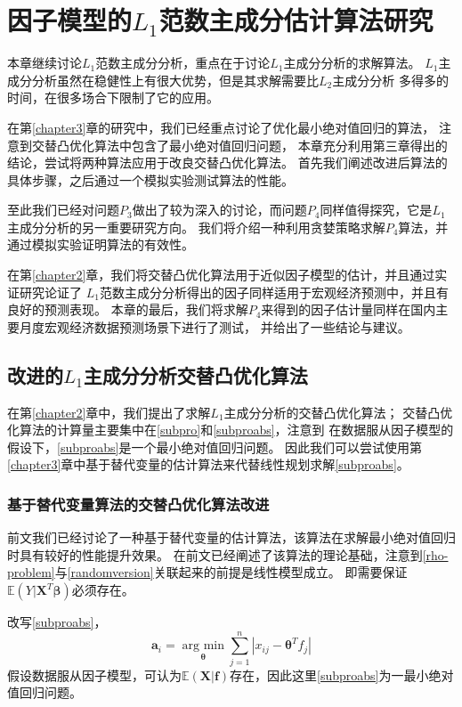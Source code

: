 \section{因子模型的$L_1$范数主成分估计算法研究}

本章继续讨论$L_1$范数主成分分析，重点在于讨论$L_1$主成分分析的求解算法。
$L_1$主成分分析虽然在稳健性上有很大优势，但是其求解需要比$L_2$主成分分析
多得多的时间，在很多场合下限制了它的应用。

在第\ref{chapter3}章的研究中，我们已经重点讨论了优化最小绝对值回归的算法，
注意到交替凸优化算法中包含了最小绝对值回归问题，
本章充分利用第三章得出的结论，尝试将两种算法应用于改良交替凸优化算法。
首先我们阐述改进后算法的具体步骤，之后通过一个模拟实验测试算法的性能。

至此我们已经对问题$P_3$做出了较为深入的讨论，而问题$P_4$同样值得探究，它是$L_1$主成分分析的另一重要研究方向。
我们将介绍一种利用贪婪策略求解$P_4$算法，并通过模拟实验证明算法的有效性。

在第\ref{chapter2}章，我们将交替凸优化算法用于近似因子模型的估计，并且通过实证研究论证了
$L_1$范数主成分分析得出的因子同样适用于宏观经济预测中，并且有良好的预测表现。
本章的最后，我们将求解$P_4$来得到的因子估计量同样在国内主要月度宏观经济数据预测场景下进行了测试，
并给出了一些结论与建议。

\subsection{改进的$L_1$主成分分析交替凸优化算法}
在第\ref{chapter2}章中，我们提出了求解$L_1$主成分分析的交替凸优化算法；
交替凸优化算法的计算量主要集中在\eqref{subpro}和\eqref{subproabs}，注意到
在数据服从因子模型的假设下，\eqref{subproabs}是一个最小绝对值回归问题。
因此我们可以尝试使用第\ref{chapter3}章中基于替代变量的估计算法来代替线性规划求解\eqref{subproabs}。

\subsubsection{基于替代变量算法的交替凸优化算法改进}
前文我们已经讨论了一种基于替代变量的估计算法，该算法在求解最小绝对值回归时具有较好的性能提升效果。
在前文已经阐述了该算法的理论基础，注意到\eqref{rho-problem}与\eqref{randomversion}关联起来的前提是线性模型成立。
即需要保证$\mathbb E(Y|\bm{X}^T\bm{\beta})$必须存在。

改写\eqref{subproabs}，
\begin{equation}
    \bm a_i = \underset{\bm {\theta}}{\operatorname{arg\ min}} \sum_{j=1}^n |x_{ij} -\bm{\theta}^Tf_j|
\end{equation}
假设数据服从因子模型，可认为$\mathbb E (\bm X|\bm{f})$存在，因此这里\eqref{subproabs}为一最小绝对值回归问题。


